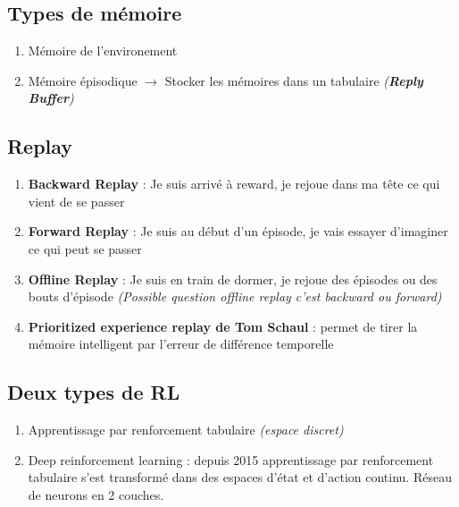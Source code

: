 \documentclass{article}
\begin{document}
\subsection{Types de mémoire}
\begin{enumerate}
    \item Mémoire de l'environement
    \item Mémoire épisodique $\rightarrow$ Stocker les mémoires dans un tabulaire \textit{(\textbf{Reply Buffer})}
\end{enumerate}
\subsection{Replay}
\begin{enumerate}
    \item \textbf{Backward Replay} : Je suis arrivé à reward, je rejoue dans ma tête ce qui vient de se passer
    \item \textbf{Forward Replay} : Je suis au début d'un épisode, je vais essayer d'imaginer ce qui peut se passer
    \item \textbf{Offline Replay} : Je suis en train de dormer, je rejoue des épisodes ou des bouts d'épisode \textit{(Possible question offline replay c'est backward ou forward)}
    \item \textbf{Prioritized experience replay de Tom Schaul} : permet de tirer la mémoire intelligent par l'erreur de différence temporelle
\end{enumerate}
\subsection{Deux types de RL}
\begin{enumerate}
    \item Apprentissage par renforcement tabulaire \textit{(espace discret)}
    \item Deep reinforcement learning : depuis 2015 apprentissage par renforcement tabulaire s'est transformé dans des espaces d'état et d'action continu. Réseau de neurons en 2 couches.
\end{enumerate}
\end{document}
